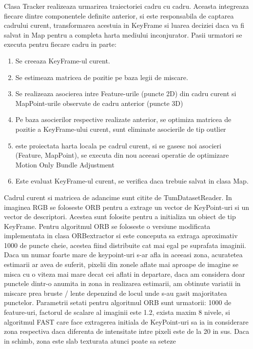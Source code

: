 \documentclass[12pt,a4paper]{report}
\begin{document}
Clasa Tracker realizeaza urmarirea traiectoriei cadru cu cadru. Aceasta integreaza 
fiecare dintre componentele definite anterior, si este responsabila de captarea cadrului curent,
transformarea acestuia in KeyFrame si luarea deciziei daca va fi salvat in Map pentru a completa 
harta mediului inconjurator. Pasii urmatori se executa pentru fiecare cadru in parte:
\begin{enumerate}
    \item Se creeaza KeyFrame-ul curent.
    \item Se estimeaza matricea de pozitie pe baza legii de miscare.
    \item Se realizeaza asocierea intre Feature-urile (puncte 2D) din cadru curent si 
MapPoint-urile observate de cadru anterior (puncte 3D)
    \item Pe baza asocierilor respective realizate anterior, se optimiza matricea de pozitie
a KeyFrame-ului curent, sunt eliminate asocierile de tip outlier
    \item este proiectata harta locala pe cadrul curent, si se gasesc noi asocieri 
(Feature, MapPoint), se executa din nou aceeasi operatie de optimizare Motion Only Bundle Adjustment
    \item Este evaluat KeyFrame-ul curent, se verifica daca trebuie salvat in clasa Map. 
\end{enumerate}
Cadrul curent si matricea de adancime sunt citite de TumDatasetReader. In imaginea RGB 
se foloseste ORB pentru a extrage un vector de KeyPoint-uri si un vector de descriptori. 
Acestea sunt folosite pentru a initializa un obiect de tip KeyFrame. Pentru algoritmul ORB se 
foloseste o versiune modificata implementata in clasa ORBextractor si este conceputa sa extraga 
aproximativ 1000 de puncte cheie, acestea fiind distribuite cat mai egal pe suprafata imaginii. 
Daca un numar foarte mare de keypoint-uri s-ar afla in aceeasi zona, acuratetea estimarii ar 
avea de suferit, pixelii din zonele aflate mai aproape de imagine se misca cu o viteza mai mare 
decat cei aflati in departare, daca am considera doar punctele dintr-o anumita in zona in realizarea
estimarii, am obtinute variatii in miscare prea bruste / lente depenzind de locul unde s-au gasit 
majoritatea punctelor.  Parametrii setati pentru algoritmul ORB sunt urmatorii: 1000 de feature-uri,
factorul de scalare al imaginii este 1.2, exista maxim 8 nivele, si algoritmul FAST care face 
extragerea initiala de KeyPoint-uri sa ia in considerare zona respectiva daca diferenta de intensitate
intre pixeli este de la 20 in sus. Daca in schimb, zona este slab texturata atunci poate sa seteze
\end{document}
